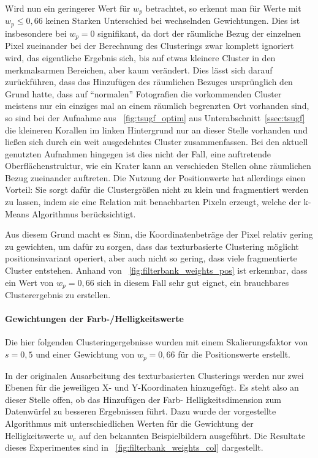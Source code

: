Wird nun ein geringerer Wert für $w_p$ betrachtet, so erkennt man für Werte mit $w_p\leq0,66$ keinen Starken Unterschied bei wechselnden Gewichtungen. Dies ist insbesondere bei $w_p=0$ signifikant, da dort der räumliche Bezug der einzelnen Pixel zueinander bei der Berechnung des Clusterings zwar komplett ignoriert wird, das eigentliche Ergebnis sich, bis auf etwas kleinere Cluster in den merkmalsarmen Bereichen, aber kaum verändert. Dies lässt sich darauf zurückführen, dass das Hinzufügen des räumlichen Bezuges ursprünglich den Grund hatte, dass auf \enquote{normalen} Fotografien die vorkommenden Cluster meistens nur ein einziges mal an einem räumlich begrenzten Ort vorhanden sind, so sind \zB bei der Aufnahme aus \figurename~\ref{fig:tsugf_optim} aus Unterabschnitt~\ref{ssec:tsugf} die kleineren Korallen im linken Hintergrund nur an dieser Stelle vorhanden und ließen sich durch ein weit ausgedehntes Cluster zusammenfassen. Bei den aktuell genutzten Aufnahmen hingegen ist dies nicht der Fall, eine auftretende Oberflächenstruktur, wie \zB ein Krater kann an verschieden Stellen ohne räumlichen Bezug zueinander auftreten.
Die Nutzung der Positionwerte hat allerdings einen Vorteil: Sie sorgt dafür die Clustergrößen nicht zu klein und fragmentiert werden zu lassen, indem sie eine Relation mit benachbarten Pixeln erzeugt, welche der k-Means Algorithmus berücksichtigt.

Aus diesem Grund macht es Sinn, die Koordinatenbeträge der Pixel relativ gering zu gewichten, um dafür zu sorgen, dass das texturbasierte Clustering möglicht positionsinvariant operiert, aber auch nicht so gering, dass viele fragmentierte Cluster entstehen. Anhand von \figurename~\ref{fig:filterbank_weights_pos} ist erkennbar, dass ein Wert von  $w_p=0,66$ sich in diesem Fall sehr gut eignet, ein brauchbares Clusterergebnis zu erstellen.

\paragraph{Gewichtungen der Farb-/Helligkeitswerte}
Die hier folgenden Clusteringergebnisse wurden mit einem Skalierungsfaktor von $s=0,5$ und einer Gewichtung von $w_p=0,66$ für die Positionswerte erstellt.

In der originalen Ausarbeitung des texturbasierten Clusterings \cite{jain_91} werden nur zwei Ebenen für die jeweiligen X- und Y-Koordinaten hinzugefügt. Es steht also an dieser Stelle offen, ob das Hinzufügen der Farb- \bzw Helligkeitsdimension zum Datenwürfel zu besseren Ergebnissen führt. Dazu wurde der vorgestellte Algorithmus mit unterschiedlichen Werten für die Gewichtung der Helligkeitswerte $w_c$ auf den bekannten Beispielbildern ausgeführt. Die Resultate dieses Experimentes sind in \figurename~\ref{fig:filterbank_weights_col} dargestellt.

